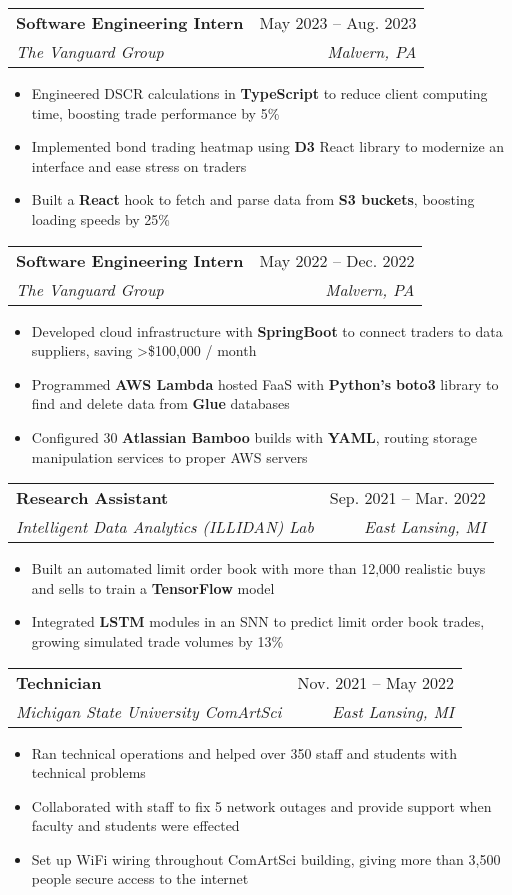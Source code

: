 \documentclass[letterpaper,11pt]{article}
\makeatletter
\newcommand{\resumeItem}[1]{
  \item\small{
    {#1 \vspace{-2pt}}
  }
}
\newcommand{\resumeSubheading}[4]{
  \vspace{-2pt}\item
    \begin{tabular*}{0.97\textwidth}[t]{l@{\extracolsep{\fill}}r}
      \textbf{#1} & #2 \\
      \textit{\small#3} & \textit{\small #4} \\
    \end{tabular*}\vspace{-7pt}
}
\newcommand{\resumeSubSubheading}[2]{
    \item
    \begin{tabular*}{0.97\textwidth}{l@{\extracolsep{\fill}}r}
      \textit{\small#1} & \textit{\small #2} \\
    \end{tabular*}\vspace{-7pt}
}
\newcommand{\resumeSubHeadingListEnd}{\end{itemize}}
\newcommand{\resumeItemListStart}{\begin{itemize}}
\newcommand{\resumeItemListEnd}{\end{itemize}\vspace{-7pt}}
\makeatother
\begin{document}

    \resumeSubheading
      {Software Engineering Intern}{May 2023 -- Aug. 2023}
      {The Vanguard Group}{Malvern, PA}
      \resumeItemListStart
        \resumeItem{Engineered DSCR calculations in \textbf{TypeScript} to reduce client computing time, boosting trade performance by 5\%}
        \resumeItem{Implemented bond trading heatmap using \textbf{D3} React library to modernize an interface and ease stress on traders}
        \resumeItem{Built a \textbf{React} hook to fetch and parse data from \textbf{S3 buckets}, boosting loading speeds by 25\%}
    \resumeItemListEnd

    \resumeSubheading
      {Software Engineering Intern}{May 2022 -- Dec. 2022}
      {The Vanguard Group}{Malvern, PA}
      \resumeItemListStart
        \resumeItem{Developed cloud infrastructure with \textbf{SpringBoot} to connect traders to data suppliers, saving \textgreater \$100,000 / month}
        \resumeItem{Programmed \textbf{AWS Lambda} hosted FaaS with \textbf{Python's} \textbf{boto3} library to find and delete data from \textbf{Glue} databases}
        \resumeItem{Configured 30 \textbf{Atlassian Bamboo} builds with \textbf{YAML}, routing storage manipulation services to proper AWS servers}
      \resumeItemListEnd
    
      \resumeSubheading
      {Research Assistant}{Sep. 2021 -- Mar. 2022}
      {Intelligent Data Analytics (ILLIDAN) Lab}{East Lansing, MI}
      \resumeItemListStart
        \resumeItem{Built an automated limit order book with more than 12,000 realistic buys and sells to train a \textbf{TensorFlow} model}
        \resumeItem{Integrated \textbf{LSTM} modules in an SNN to predict limit order book trades, growing simulated trade volumes by 13\%}
    \resumeItemListEnd

    \resumeSubheading
        {Technician}{Nov. 2021 -- May 2022}
        {Michigan State University ComArtSci}{East Lansing, MI}
        \resumeItemListStart
        \resumeItem{Ran technical operations and helped over 350 staff and students with technical problems}
        \resumeItem{Collaborated with staff to fix 5 network outages and provide support when faculty and students were effected}
        \resumeItem{Set up WiFi wiring throughout ComArtSci building, giving more than 3,500 people secure access to the internet}
        \resumeItemListEnd
\end{document}
